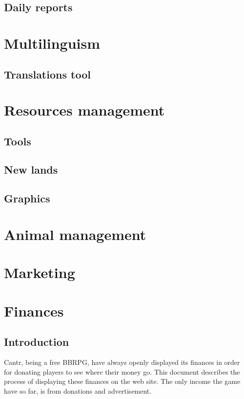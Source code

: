\documentclass[a4paper,12pt]{article}
\begin{document}
\subsection{Daily reports}

\section{Multilinguism}

\subsection{Translations tool}

\section{Resources management}

\subsection{Tools}

\subsection{New lands}

\subsection{Graphics}

\section{Animal management}

\section{Marketing}

\section{Finances}

\subsection{Introduction}

Cantr, being a free BBRPG, have always openly displayed its finances in order for donating players to see where their money go. This document describes the process of displaying these finances on the web site. The only income the game have so far, is from donations and advertisement.
\end{document}
